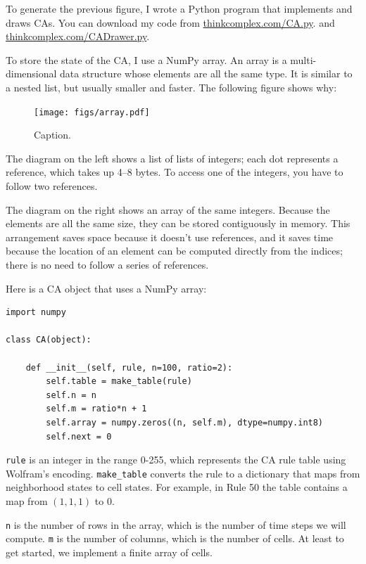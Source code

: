 \documentclass[10pt]{book}
\begin{document}
To generate the previous figure, I wrote a Python program that
implements and draws CAs.
You can download my code from \url{thinkcomplex.com/CA.py}.
and \url{thinkcomplex.com/CADrawer.py}.

To store the state of the CA, I use a NumPy array.  An array is a
multi-dimensional data structure whose elements are all the same type.
It is similar to a nested list, but usually smaller and faster.  The
following figure shows why:

\begin{figure}
\centerline{\texttt{[image: figs/array.pdf]}}
\caption{Caption.}
\end{figure}

The diagram on the left shows a list of lists of integers; each
dot represents a reference, which takes up 4--8 bytes.  To access
one of the integers, you have to follow two references.

The diagram on the right shows an array of the same integers.  Because
the elements are all the same size, they can be stored contiguously in
memory.  This arrangement saves space because it doesn't use
references, and it saves time because the location of an element can
be computed directly from the indices; there is no need to follow a
series of references.

Here is a CA object that uses a NumPy array:

\begin{verbatim}
import numpy

class CA(object):

    def __init__(self, rule, n=100, ratio=2):
        self.table = make_table(rule)
        self.n = n
        self.m = ratio*n + 1
        self.array = numpy.zeros((n, self.m), dtype=numpy.int8)
        self.next = 0
\end{verbatim}

{\tt rule} is an integer in the range 0-255, which represents the
CA rule table using Wolfram's encoding.  \verb"make_table" converts
the rule to a dictionary that maps from neighborhood states to cell
states.  For example, in Rule 50 the table contains a map from
$(1,1,1)$ to 0.

{\tt n} is the number of rows in the array, which is the number
of time steps we will compute.  {\tt m} is the number of columns,
which is the number of cells.  At least to get started, we implement
a finite array of cells.
\end{document}
